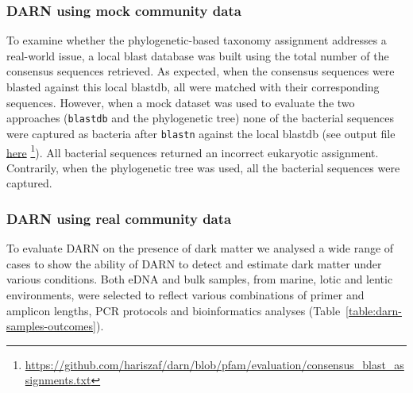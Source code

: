    \newpage

   \subsubsection*{DARN using mock community data}

   To examine whether the phylogenetic-based taxonomy assignment addresses a real-world issue, a local blast database was built using the total number of the consensus sequences retrieved. 
   As expected, when the consensus sequences were blasted against this local blastdb, all were matched with their corresponding sequences. 
   However, when a mock dataset was used to evaluate the two approaches (\texttt{blastdb} and the phylogenetic tree) none of the bacterial sequences were captured as bacteria after \texttt{blastn} against the local blastdb (see output file \href{https://github.com/hariszaf/darn/blob/pfam/evaluation/consensus_blast_assignments.txt}{here} 
   \footnote{
      \href{https://github.com/hariszaf/darn/blob/pfam/evaluation/consensus_blast_assignments.txt}{https://github.com/hariszaf/darn/blob/pfam/evaluation/consensus\_blast\_assignments.txt}
   }). 
   All bacterial sequences returned an incorrect eukaryotic assignment. 
   Contrarily, when the phylogenetic tree was used, all the bacterial sequences were captured.


   \subsubsection*{DARN using real community data}

   To evaluate DARN on the presence of dark matter we analysed a wide range of cases to show the ability of DARN to detect and estimate dark matter under various conditions. 
   Both eDNA and bulk samples, from marine, lotic and lentic environments, were selected to reflect various combinations of primer and amplicon lengths, PCR protocols and bioinformatics analyses (Table~\ref{table:darn-samples-outcomes}).

